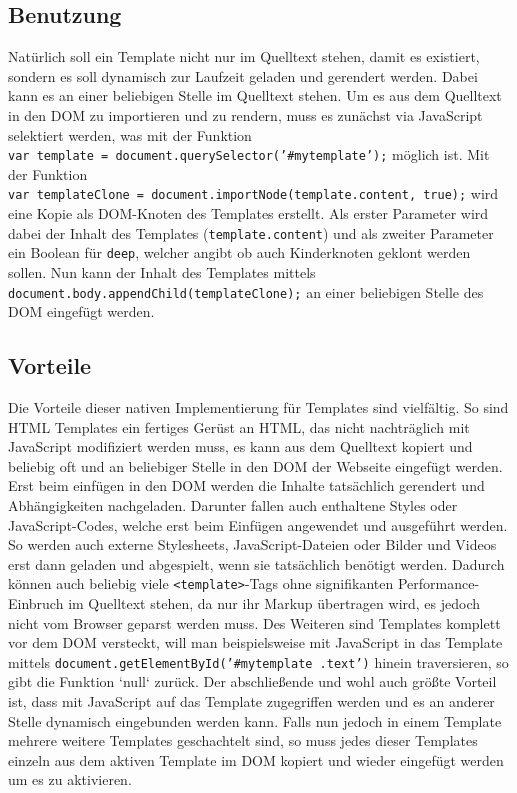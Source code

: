 \subsection{Benutzung}\label{benutzung}

Natürlich soll ein Template nicht nur im Quelltext stehen, damit es existiert, sondern es soll dynamisch zur Laufzeit geladen und gerendert werden. Dabei kann es an einer beliebigen Stelle im Quelltext stehen. Um es aus dem Quelltext in den DOM zu importieren und zu rendern, muss es zunächst via JavaScript selektiert werden, was mit der Funktion \texttt{var\ template\ =\ document.querySelector('\#mytemplate');} möglich ist. Mit der Funktion \texttt{var\ templateClone\ =\ document.importNode(template.content,\ true);} wird eine Kopie als DOM-Knoten des Templates erstellt. Als erster Parameter wird dabei der Inhalt des Templates (\texttt{template.content}) und als zweiter Parameter ein Boolean für \texttt{deep}, welcher angibt ob auch Kinderknoten geklont werden sollen. Nun kann der Inhalt des Templates mittels \texttt{document.body.appendChild(templateClone);} an einer beliebigen Stelle des DOM eingefügt werden.


\subsection{Vorteile}\label{vorteile}

Die Vorteile dieser nativen Implementierung für Templates sind vielfältig. So sind HTML Templates ein fertiges Gerüst an HTML, das nicht nachträglich mit JavaScript modifiziert werden muss, es kann aus dem Quelltext kopiert und beliebig oft und an beliebiger Stelle in den DOM der Webseite eingefügt werden. Erst beim einfügen in den DOM werden die Inhalte tatsächlich gerendert und Abhängigkeiten nachgeladen. Darunter fallen auch enthaltene Styles oder JavaScript-Codes, welche erst beim Einfügen angewendet und ausgeführt werden. So werden auch externe Stylesheets, JavaScript-Dateien oder Bilder und Videos erst dann geladen und abgespielt, wenn sie tatsächlich benötigt werden. Dadurch können auch beliebig viele \texttt{\textless{}template\textgreater{}}-Tags ohne signifikanten Performance-Einbruch im Quelltext stehen, da nur ihr Markup übertragen wird, es jedoch nicht vom Browser geparst werden muss. Des Weiteren sind Templates komplett vor dem DOM versteckt, will man beispielsweise mit JavaScript in das Template mittels \texttt{document.getElementById('\#mytemplate\ .text')} hinein traversieren, so gibt die Funktion `null` zurück. Der abschließende und wohl auch größte Vorteil ist, dass mit JavaScript auf das Template zugegriffen werden und es an anderer Stelle dynamisch eingebunden werden kann.
Falls nun jedoch in einem Template mehrere weitere Templates geschachtelt sind, so muss jedes dieser Templates einzeln aus dem aktiven Template im DOM kopiert und wieder eingefügt werden um es zu aktivieren.


